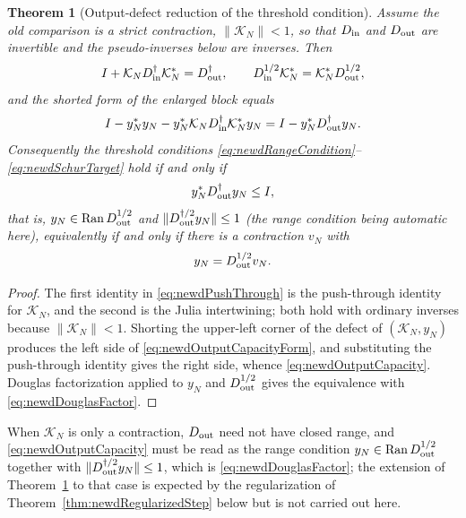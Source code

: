 \documentclass[11pt]{amsart}
\newtheorem{theorem}{Theorem}[section]
\theoremstyle{definition}
\theoremstyle{remark}
\begin{document}
\begin{theorem}[Output-defect reduction of the threshold condition]
\label{thm:newdOutputDefect}
Assume the old comparison is a strict contraction, \(\|\mathcal K_N\|<1\), so
that \(D_{\rm in}\) and \(D_{\rm out}\) are invertible and the pseudo-inverses
below are inverses.  Then
\begin{equation}\label{eq:newdPushThrough}
 I+\mathcal K_ND_{\rm in}^\dagger\mathcal K_N^*=D_{\rm out}^\dagger,
 \qquad
 D_{\rm in}^{1/2}\mathcal K_N^*=\mathcal K_N^*D_{\rm out}^{1/2},
\end{equation}
and the shorted form of the enlarged block equals
\begin{equation}\label{eq:newdOutputCapacityForm}
 I-y_N^*y_N-y_N^*\mathcal K_ND_{\rm in}^\dagger\mathcal K_N^*y_N
 =I-y_N^*D_{\rm out}^\dagger y_N .
\end{equation}
Consequently the threshold conditions
\eqref{eq:newdRangeCondition}--\eqref{eq:newdSchurTarget} hold if and only if
\begin{equation}\label{eq:newdOutputCapacity}
 y_N^*D_{\rm out}^\dagger y_N\le I,
\end{equation}
that is, \(y_N\in\operatorname{Ran}D_{\rm out}^{1/2}\) and
\(\|D_{\rm out}^{\dagger/2}y_N\|\le1\) (the range condition being automatic
here), equivalently if and only if there is a contraction \(v_N\) with
\begin{equation}\label{eq:newdDouglasFactor}
 y_N=D_{\rm out}^{1/2}v_N .
\end{equation}
\end{theorem}

\begin{proof}
The first identity in \eqref{eq:newdPushThrough} is the push-through identity
for \(\mathcal K_N\), and the second is the Julia intertwining; both hold
with ordinary inverses because \(\|\mathcal K_N\|<1\).  Shorting the upper-left
corner of the defect of \((\mathcal K_N,y_N)\) produces the left side of
\eqref{eq:newdOutputCapacityForm}, and substituting the push-through identity
gives the right side, whence \eqref{eq:newdOutputCapacity}.  Douglas
factorization applied to \(y_N\) and \(D_{\rm out}^{1/2}\) gives the
equivalence with \eqref{eq:newdDouglasFactor}.
\end{proof}

When \(\mathcal K_N\) is only a contraction, \(D_{\rm out}\) need not have
closed range, and \eqref{eq:newdOutputCapacity} must be read as the range
condition \(y_N\in\operatorname{Ran}D_{\rm out}^{1/2}\) together with
\(\|D_{\rm out}^{\dagger/2}y_N\|\le1\), which is \eqref{eq:newdDouglasFactor};
the extension of Theorem~\ref{thm:newdOutputDefect} to that case is expected
by the regularization of Theorem~\ref{thm:newdRegularizedStep} below but is
not carried out here.
\end{document}
